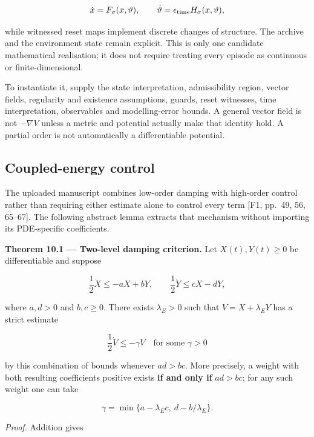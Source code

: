 \documentclass[11pt,a4paper]{article}
\begin{document}
\[\dot x=F_\sigma(x,\vartheta),\qquad
\dot\vartheta=\epsilon_{\rm time}H_\sigma(x,\vartheta),\]

while witnessed reset maps implement discrete changes of structure. The
archive and the environment state remain explicit. This is only one
candidate mathematical realisation; it does not require treating every
episode as continuous or finite-dimensional.

To instantiate it, supply the state interpretation, admissibility
region, vector fields, regularity and existence assumptions, guards,
reset witnesses, time interpretation, observables and modelling-error
bounds. A general vector field is not \(-\nabla V\) unless a metric and
potential actually make that identity hold. A partial order is not
automatically a differentiable potential.

\subsection{Coupled-energy control}\label{coupled-energy-control}

The uploaded manuscript combines low-order damping with high-order
control rather than requiring either estimate alone to control every
term {[}F1, pp.~49, 56, 65--67{]}. The following abstract lemma extracts
that mechanism without importing its PDE-specific coefficients.


\textbf{Theorem 10.1 --- Two-level damping criterion.} Let
\(X(t),Y(t)\geq0\) be differentiable and suppose

\nopagebreak[4]

\[
\frac12\dot X\leq-aX+bY,\qquad
\frac12\dot Y\leq cX-dY,
\]

where \(a,d>0\) and \(b,c\geq0\). There exists \(\lambda_E>0\) such that
\(V=X+\lambda_EY\) has a strict estimate

\nopagebreak[4]

\[\frac12\dot V\leq-\gamma V\quad\text{for some }\gamma>0\]

by this combination of bounds whenever \(ad>bc\). More precisely, a
weight with both resulting coefficients positive exists \textbf{if and
only if} \(ad>bc\); for any such weight one can take

\nopagebreak[4]

\[\gamma=\min\{a-\lambda_Ec,\ d-b/\lambda_E\}.\]

\emph{Proof.} Addition gives

\nopagebreak[4]
\end{document}
